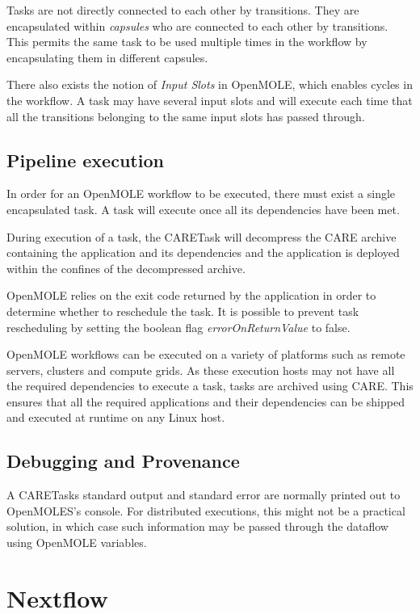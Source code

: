 \documentclass{report}
\begin{document}
      Tasks are not directly connected to each other by transitions. They are
encapsulated within \textit{capsules} who are connected to each other by
transitions. This permits the same task to be used multiple times in the
workflow by encapsulating them in different capsules.

    There also exists the notion of \textit{Input Slots} in OpenMOLE, which enables
cycles in the workflow. A task may have several input slots and will execute
each time that all the transitions belonging to the same input slots has passed
through.
 
                

        \subsection{Pipeline execution}

      In order for an OpenMOLE workflow to be executed, there must exist a
single encapsulated task. A task will execute once all its dependencies have
been met. 

    During execution of a task, the CARETask will decompress the CARE archive
containing the application and its dependencies and the application is deployed
within the confines of the decompressed archive. 

OpenMOLE relies on the exit code returned by the application in order to
determine whether to reschedule the task. It is possible to prevent task
rescheduling by setting the boolean flag \textit{errorOnReturnValue} to false.
    
      OpenMOLE workflows can be executed on a variety of platforms such as
remote servers, clusters and compute grids. As these execution hosts may not have all
the required dependencies to execute a task, tasks are archived using CARE. This
ensures that all the required applications and their dependencies can be shipped
and executed at runtime on any Linux host.


        \subsection{Debugging and Provenance}
    A CARETasks standard output and standard error are normally printed out to
OpenMOLES's console. For distributed executions, this might not be a practical
solution, in which case such information may be passed through
the dataflow using OpenMOLE variables.
         
        \section{Nextflow}
\end{document}
